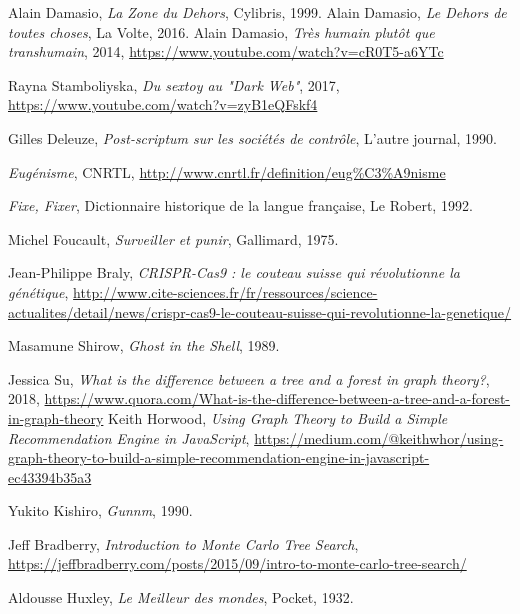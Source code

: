 \begin{thebibliography}{99}
     Alain Damasio, \emph{La Zone du Dehors}, Cylibris, 1999.
     Alain Damasio, \emph{Le Dehors de toutes choses}, La Volte, 2016.
     Alain Damasio, \emph{Très humain plutôt que transhumain}, 2014, \url{https://www.youtube.com/watch?v=cR0T5-a6YTc}

     Rayna Stamboliyska, \emph{Du sextoy au "Dark Web"}, 2017, \url{https://www.youtube.com/watch?v=zyB1eQFskf4}

     Gilles Deleuze, \emph{Post-scriptum sur les sociétés de contrôle}, L'autre journal, 1990.

     \emph{Eugénisme}, CNRTL, \url{http://www.cnrtl.fr/definition/eug%C3%A9nisme}

     \emph{Fixe, Fixer}, Dictionnaire historique de la langue française, Le Robert, 1992. 

     Michel Foucault, \emph{Surveiller et punir}, Gallimard, 1975.

     Jean-Philippe Braly, \emph{CRISPR-Cas9 : le couteau suisse qui révolutionne la génétique}, \url{http://www.cite-sciences.fr/fr/ressources/science-actualites/detail/news/crispr-cas9-le-couteau-suisse-qui-revolutionne-la-genetique/}

     Masamune Shirow, \emph{Ghost in the Shell}, 1989.

     Jessica Su, \emph{What is the difference between a tree and a forest in graph theory?}, 2018, \url{https://www.quora.com/What-is-the-difference-between-a-tree-and-a-forest-in-graph-theory}
     Keith Horwood, \emph{Using Graph Theory to Build a Simple Recommendation Engine in JavaScript}, \url{https://medium.com/@keithwhor/using-graph-theory-to-build-a-simple-recommendation-engine-in-javascript-ec43394b35a3}

     Yukito Kishiro, \emph{Gunnm}, 1990.

     Jeff Bradberry, \emph{Introduction to Monte Carlo Tree Search}, \url{https://jeffbradberry.com/posts/2015/09/intro-to-monte-carlo-tree-search/}

     Aldousse Huxley, \emph{Le Meilleur des mondes}, Pocket, 1932.


\end{thebibliography}
